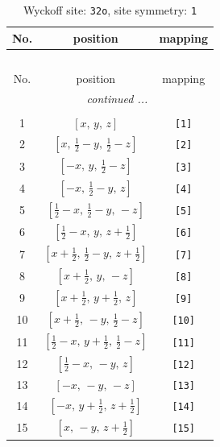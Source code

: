 \documentclass[fleqn,8pt]{jsarticle}
\begin{document}
\renewcommand{\arraystretch}{1.2}
\begin{longtable}{ccc}
\caption{Wyckoff site: {\tt 32o}, site symmetry: {\tt 1}}
 \\
 \hline \hline
No. & position & mapping \\ \hline \endfirsthead

\multicolumn{2}{l}{\tablename\ \thetable{}} \\
 \hline \hline
No. & position & mapping \\ \hline \endhead

 \hline \hline
\multicolumn{2}{r}{\footnotesize\it continued ...} \\ \endfoot

 \hline \hline
\multicolumn{2}{r}{} \\ \endlastfoot

1 & $\left[ x,\, y,\, z \right]$ & {\tt [1]} \\ \hline
2 & $\left[ x,\, \frac{1}{2} - y,\, \frac{1}{2} - z \right]$ & {\tt [2]} \\ \hline
3 & $\left[ - x,\, y,\, \frac{1}{2} - z \right]$ & {\tt [3]} \\ \hline
4 & $\left[ - x,\, \frac{1}{2} - y,\, z \right]$ & {\tt [4]} \\ \hline
5 & $\left[ \frac{1}{2} - x,\, \frac{1}{2} - y,\, - z \right]$ & {\tt [5]} \\ \hline
6 & $\left[ \frac{1}{2} - x,\, y,\, z + \frac{1}{2} \right]$ & {\tt [6]} \\ \hline
7 & $\left[ x + \frac{1}{2},\, \frac{1}{2} - y,\, z + \frac{1}{2} \right]$ & {\tt [7]} \\ \hline
8 & $\left[ x + \frac{1}{2},\, y,\, - z \right]$ & {\tt [8]} \\ \hline
9 & $\left[ x + \frac{1}{2},\, y + \frac{1}{2},\, z \right]$ & {\tt [9]} \\ \hline
10 & $\left[ x + \frac{1}{2},\, - y,\, \frac{1}{2} - z \right]$ & {\tt [10]} \\ \hline
11 & $\left[ \frac{1}{2} - x,\, y + \frac{1}{2},\, \frac{1}{2} - z \right]$ & {\tt [11]} \\ \hline
12 & $\left[ \frac{1}{2} - x,\, - y,\, z \right]$ & {\tt [12]} \\ \hline
13 & $\left[ - x,\, - y,\, - z \right]$ & {\tt [13]} \\ \hline
14 & $\left[ - x,\, y + \frac{1}{2},\, z + \frac{1}{2} \right]$ & {\tt [14]} \\ \hline
15 & $\left[ x,\, - y,\, z + \frac{1}{2} \right]$ & {\tt [15]} \\ \hline

\end{longtable}
\end{document}
